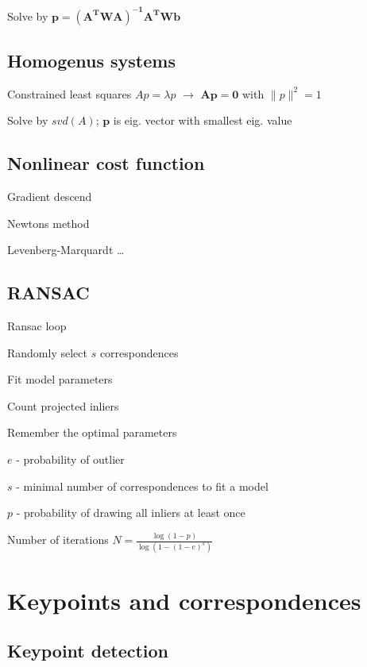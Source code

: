 \documentclass{article}
\begin{document}
\begin{multicols*}{2}
{	Solve by $\mathbf{p = (A^TWA)^{-1}A^TWb}$

	\subsection{Homogenus systems}

	Constrained least squares $Ap = \lambda p$ $\to$ $\mathbf{Ap = 0}$ with $\|p\|^2=1$

	Solve by $svd(A)$; $\mathbf{p}$ is eig. vector with smallest eig. value

	\subsection{Nonlinear cost function}
	\begin{compactitem}
		\item Gradient descend
		\item Newtons method
		\item Levenberg-Marquardt
		\dots
	\end{compactitem}

	\subsection{RANSAC}

	Ransac loop
	\begin{compactenum}
		\item Randomly select $s$ correspondences
		\item Fit model parameters
		\item Count projected inliers
		\item Remember the optimal parameters

	\end{compactenum}
	$e$ - probability of outlier

	$s$ - minimal number of correspondences to fit a model

	$p$ - probability of drawing all inliers at least once

	Number of iterations $N = \frac{\log{(1-p)}}{\log{(1-(1-e)^s)}}$

	\section{Keypoints and correspondences}

	\subsection{Keypoint detection}

}
\end{multicols*}
\end{document}
